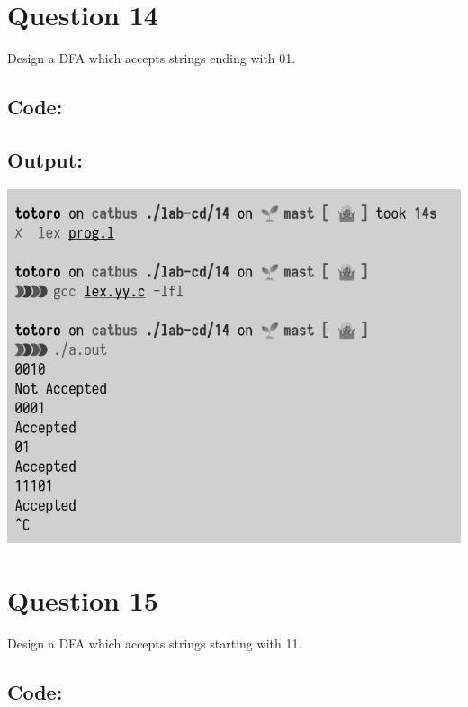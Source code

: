 \documentclass{article}
\begin{document}
\newpage
\section*{Question 14}
Design a DFA which accepts strings ending with 01.
\subsection*{Code:}

\newpage
\subsection*{Output:}
\begin{center}
  \includegraphics[width=14cm]{14/out.png}
\end{center}

\newpage
\section*{Question 15}
Design a DFA which accepts strings starting with 11.
\subsection*{Code:}

\newpage
\end{document}
